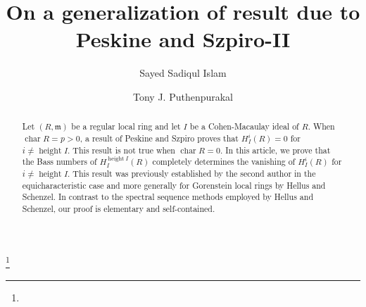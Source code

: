\documentclass[12pt,reqno]{amsart}
\theoremstyle{definition}
\newcommand{\m}{\mathfrak{m}}
\newcommand{\height}{\operatorname{height}}
\newcommand{\Char}{\operatorname{char}}
\begin{document}
\title[]{On a generalization of result due to Peskine and Szpiro-II}
\author[Sayed Sadiqul Islam]{Sayed Sadiqul Islam}
\address{Indian Institute of Technology Bombay, Mumbai, India}
\author{Tony J. Puthenpurakal}
\address{Indian Institute of Technology Bombay, Mumbai, India}

 
\thanks{}
 
\begin{abstract} 
 Let $(R,\m)$ be a regular local ring and let $I$ be a Cohen-Macaulay ideal of $R$. When $\Char R=p>0$, a result of Peskine and Szpiro proves that $H^i_I(R)=0$ for $i\neq\height I$. This result is not true when $\Char R=0$. In this article, we prove that the Bass numbers of $H^{\height I}_I(R)$ completely determines the vanishing of $H^i_I(R)$ for $i\neq \height I$. This result was previously established by the second author in the equicharacteristic case and more generally for Gorenstein local rings by Hellus and Schenzel. In contrast to the spectral sequence methods employed by Hellus and Schenzel, our proof is elementary and self-contained.
\end{abstract}
\maketitle
\end{document}
